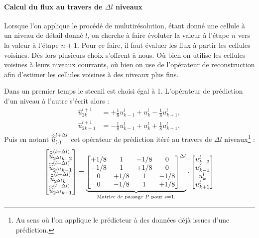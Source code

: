 \paragraph{Calcul du flux au travers de $\Delta l$ niveaux}
Lorsque l'on applique le procédé de mulutirésolution, étant donné une cellule à un niveau de détail donné $l$, on cherche à faire évoluter la valeur à l'étape $n$ vers la valeur à l'étape $n+1$. 
Pour ce faire, il faut évaluer les flux à partir les cellules voisines. Dès lors plusieurs choix s'offrent à nous. Où bien on utilise les cellules voisines à leurs niveaux courrants, où bien on use de l'opérateur 
de reconstruction afin d'estimer les cellules voisines à des niveaux plus fins.\par
Dans un premier temps le stecnil est choisi égal à 1. L'opérateur de prédiction d'un niveau à l'autre s'écrit alors : 
\begin{align*}
    \hat u^{l+1}_{2k} &= +\frac{1}{8} u^l_{k-1} + u^l_k - \frac{1}{8} u^l_{k+1},\\
    \hat u^{l+1}_{2k+1} &= -\frac{1}{8} u^l_{k-1} + u^l_k + \frac{1}{8} u^l_{k+1}.
\end{align*}
Puis en notant $\widehat{\widehat{u}}^{l+\Delta l}_{(\cdot)}$ cet opérateur de prédiction itéré au travers de $\Delta l$ niveaux\footnote{
    Au sens où l'on applique le prédicteur à des données déjà issues d'une prédiction.
} : 
\begin{align*}
    \begin{bmatrix}
        \widehat{\widehat{u}}^{(l+\Delta l)}_{2^{\Delta l}k-2}\\
        \widehat{\widehat{u}}^{(l+\Delta l)}_{2^{\Delta l}k-1}\\
        \widehat{\widehat{u}}^{(l+\Delta l)}_{2^{\Delta l}k}\\
        \widehat{\widehat{u}}^{(l+\Delta l)}_{2^{\Delta l}k+1}\\
    \end{bmatrix}
        =
    \underbrace{
    \begin{bmatrix}
        +1/8 & 1 & -1/8 & 0 \\
        -1/8 & 1 & +1/8 & 0 \\
        0 & +1/8 & 1 & -1/8 \\
        0 & -1/8 & 1 & +1/8 
    \end{bmatrix}^{\Delta l}}_{\text{Matrice de passage } P \text{ pour }s=1.}
    \cdot
    \begin{bmatrix}
        u^l_{k-2}\\
        u^l_{k-1}\\
        u^l_{k}\\
        u^l_{k+1}\\
    \end{bmatrix}
\end{align*}

